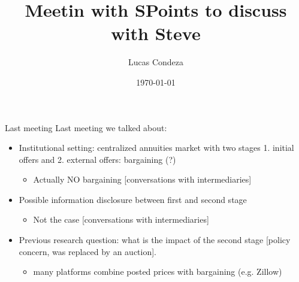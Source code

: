 \documentclass[10pt,aspectratio=169]{beamer}
\title{Meetin with SPoints to discuss with Steve}
\author{%
 Lucas Condeza
\inst{1} \and
}
\institute{
  \inst{1} Yale University \\
}
\date{\today}
\begin{document}



\begin{frame}{Last meeting}
Last meeting we talked about:
\begin{itemize}
    \item Institutional setting: centralized annuities market with two stages 1. initial offers and 2. external offers: bargaining (?)  
    \begin{itemize}
        \item Actually NO bargaining [conversations with intermediaries]
    \end{itemize}
    \item Possible information disclosure between first and second stage 
    \begin{itemize}
        \item Not the case [conversations with intermediaries]
    \end{itemize}

    \item Previous research question: what is the impact of the second stage [policy concern, was replaced by an auction]. 
    \begin{itemize}
        \item  many platforms combine posted prices with bargaining (e.g. Zillow)
    \end{itemize}
\end{itemize}
\end{frame}
\end{document}
